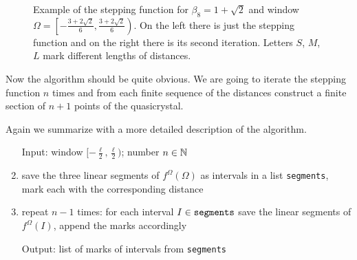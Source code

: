 \documentclass[text.tex]{subfiles}
\begin{document}
\begin{figure}[h!]
\caption{Example of the stepping function for $\beta_8 = 1+\sqrt{2}$ and window $\Omega = \left[-\frac{3+2\sqrt{2}}{6},\frac{3+2\sqrt{2}}{6}\right)$. On the left there is just the stepping function and on the right there is its second iteration. Letters $S$, $M$, $L$ mark different lengths of distances. }%
\label{fig_steppingFunction}
\end{figure}

Now the algorithm should be quite obvious. We are going to iterate the stepping function $n$ times and from each finite sequence of the distances construct a finite section of $n+1$ points of the quasicrystal. 

Again we summarize with a more detailed description of the algorithm.

\begin{enumerate}
\item[Input:] window $[-\frac{\ell}{2},\frac{\ell}{2})$; number $n\in\mathbb{N}$
\item save the three linear segments of $f^\Omega(\Omega)$ as intervals in a list \texttt{segments}, mark each with the corresponding distance
\item repeat $n-1$ times: for each interval $I\in\text{\texttt{segments}}$ save the linear segments of $f^\Omega(I)$, append the marks accordingly
\item[Output:] list of marks of intervals from \texttt{segments}
\end{enumerate}
\end{document}
